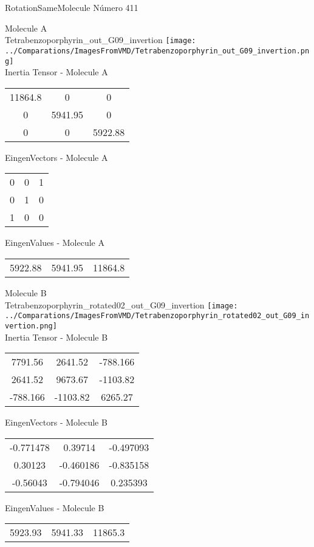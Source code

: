 \vtab[-2cm]
\begin{center}
{\large RotationSameMolecule \tab Número 411}
\end{center}
\begin{multicols}{2}
\begin{center}

Molecule A \\ 
Tetrabenzoporphyrin\_out\_G09\_invertion
\texttt{[image: ../Comparations/ImagesFromVMD/Tetrabenzoporphyrin\_out\_G09\_invertion.png]}
\\
Inertia Tensor - Molecule A \\
\vtab

\begin{tabular}{|c c c|}
11864.8	 & 	0	 & 	0	 \\
0	 & 	5941.95	 & 	0	 \\
0	 & 	0	 & 	5922.88
\end{tabular}

\vtab
 EingenVectors - Molecule A     \\
\vtab
\begin{tabular}{|c c c|}
0	 & 	0	 & 	1	 \\
0	 & 	1	 & 	0	 \\
1	 & 	0	 & 	0
\end{tabular}

\vtab
 EingenValues - Molecule A     \\
\vtab
\begin{tabular}{|c c c|}
5922.88	 & 	5941.95	 & 	11864.8	 \\
\end{tabular}
\columnbreak

Molecule B \\ 
Tetrabenzoporphyrin\_rotated02\_out\_G09\_invertion
\texttt{[image: ../Comparations/ImagesFromVMD/Tetrabenzoporphyrin\_rotated02\_out\_G09\_invertion.png]}
\\
Inertia Tensor - Molecule B \\
\vtab

\begin{tabular}{|c c c|}
7791.56	 & 	2641.52	 & 	-788.166	 \\
2641.52	 & 	9673.67	 & 	-1103.82	 \\
-788.166	 & 	-1103.82	 & 	6265.27
\end{tabular}

\vtab
 EingenVectors - Molecule B     \\
\vtab
\begin{tabular}{|c c c|}
-0.771478	 & 	0.39714	 & 	-0.497093	 \\
0.30123	 & 	-0.460186	 & 	-0.835158	 \\
-0.56043	 & 	-0.794046	 & 	0.235393
\end{tabular}

\vtab
 EingenValues - Molecule B     \\
\vtab
\begin{tabular}{|c c c|}
5923.93	 & 	5941.33	 & 	11865.3	 \\
\end{tabular}

\end{center}
\end{multicols}
